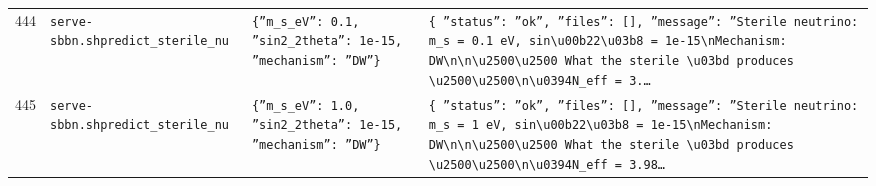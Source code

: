\documentclass[11pt,a4paper]{article}
\begin{document}
\begin{longtable}{@{}p{}p{}p{}p{}@{}}
444 & \texttt{serve-sbbn.sh}\newline\texttt{predict\_\allowbreak{}sterile\_\allowbreak{}nu} & \texttt{\{''m\_\allowbreak{}s\_\allowbreak{}eV'':\allowbreak{} 0.1,\allowbreak{} ''sin2\_\allowbreak{}2theta'':\allowbreak{} 1e-15,\allowbreak{} ''mechanism'':\allowbreak{} ''DW''\}\allowbreak{}} & \texttt{\{   ''status'':\allowbreak{} ''ok'',\allowbreak{}   ''files'':\allowbreak{} []\allowbreak{},\allowbreak{}   ''message'':\allowbreak{} ''Sterile neutrino:\allowbreak{} m\_\allowbreak{}s =\allowbreak{} 0.1 eV,\allowbreak{} sin\textbackslash{}\allowbreak{}u00b22\textbackslash{}\allowbreak{}u03b8 =\allowbreak{} 1e-15\textbackslash{}\allowbreak{}nMechanism:\allowbreak{} DW\textbackslash{}\allowbreak{}n\textbackslash{}\allowbreak{}n\textbackslash{}\allowbreak{}u2500\textbackslash{}\allowbreak{}u2500 What the sterile \textbackslash{}\allowbreak{}u03bd produces \textbackslash{}\allowbreak{}u2500\textbackslash{}\allowbreak{}u2500\textbackslash{}\allowbreak{}n\textbackslash{}\allowbreak{}u0394N\_\allowbreak{}eff =\allowbreak{} 3.\ldots{}\allowbreak{}} \\
445 & \texttt{serve-sbbn.sh}\newline\texttt{predict\_\allowbreak{}sterile\_\allowbreak{}nu} & \texttt{\{''m\_\allowbreak{}s\_\allowbreak{}eV'':\allowbreak{} 1.0,\allowbreak{} ''sin2\_\allowbreak{}2theta'':\allowbreak{} 1e-15,\allowbreak{} ''mechanism'':\allowbreak{} ''DW''\}\allowbreak{}} & \texttt{\{   ''status'':\allowbreak{} ''ok'',\allowbreak{}   ''files'':\allowbreak{} []\allowbreak{},\allowbreak{}   ''message'':\allowbreak{} ''Sterile neutrino:\allowbreak{} m\_\allowbreak{}s =\allowbreak{} 1 eV,\allowbreak{} sin\textbackslash{}\allowbreak{}u00b22\textbackslash{}\allowbreak{}u03b8 =\allowbreak{} 1e-15\textbackslash{}\allowbreak{}nMechanism:\allowbreak{} DW\textbackslash{}\allowbreak{}n\textbackslash{}\allowbreak{}n\textbackslash{}\allowbreak{}u2500\textbackslash{}\allowbreak{}u2500 What the sterile \textbackslash{}\allowbreak{}u03bd produces \textbackslash{}\allowbreak{}u2500\textbackslash{}\allowbreak{}u2500\textbackslash{}\allowbreak{}n\textbackslash{}\allowbreak{}u0394N\_\allowbreak{}eff =\allowbreak{} 3.98\ldots{}\allowbreak{}} \\

\end{longtable}
\end{document}
